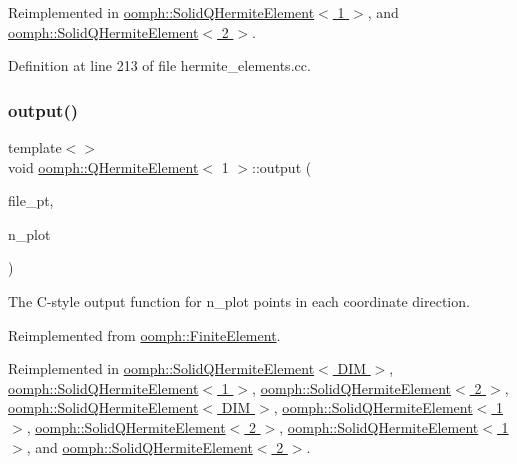 Reimplemented in \hyperlink{classoomph_1_1SolidQHermiteElement_ae4f251ca932301e92e1b897cec6f0459}{oomph\+::\+Solid\+Q\+Hermite\+Element$<$ 1 $>$}, and \hyperlink{classoomph_1_1SolidQHermiteElement_ae4f251ca932301e92e1b897cec6f0459}{oomph\+::\+Solid\+Q\+Hermite\+Element$<$ 2 $>$}.



Definition at line 213 of file hermite\+\_\+elements.\+cc.

\mbox{\label{classoomph_1_1QHermiteElement_a06e716f7fa8ed3e595089b88c68b1026}} 
\subsubsection{\texorpdfstring{output()}{output()}\hspace{0.1cm}{\footnotesize\ttfamily [4/12]}}
{\footnotesize\ttfamily template$<$$>$ \\
void \hyperlink{classoomph_1_1QHermiteElement}{oomph\+::\+Q\+Hermite\+Element}$<$ 1 $>$\+::output (\begin{DoxyParamCaption}\item[{F\+I\+LE $\ast$}]{file\+\_\+pt,  }\item[{const unsigned \&}]{n\+\_\+plot }\end{DoxyParamCaption})\hspace{0.3cm}{\ttfamily [virtual]}}



The C-\/style output function for n\+\_\+plot points in each coordinate direction. 



Reimplemented from \hyperlink{classoomph_1_1FiniteElement_adfaee690bb0608f03320eeb9d110d48c}{oomph\+::\+Finite\+Element}.



Reimplemented in \hyperlink{classoomph_1_1SolidQHermiteElement_aabd23592071d29249154d7cde20f2d88}{oomph\+::\+Solid\+Q\+Hermite\+Element$<$ D\+I\+M $>$}, \hyperlink{classoomph_1_1SolidQHermiteElement_aabd23592071d29249154d7cde20f2d88}{oomph\+::\+Solid\+Q\+Hermite\+Element$<$ 1 $>$}, \hyperlink{classoomph_1_1SolidQHermiteElement_aabd23592071d29249154d7cde20f2d88}{oomph\+::\+Solid\+Q\+Hermite\+Element$<$ 2 $>$}, \hyperlink{classoomph_1_1SolidQHermiteElement_adb8a603a0f50a7944be7af4a1cd0abc5}{oomph\+::\+Solid\+Q\+Hermite\+Element$<$ D\+I\+M $>$}, \hyperlink{classoomph_1_1SolidQHermiteElement_adb8a603a0f50a7944be7af4a1cd0abc5}{oomph\+::\+Solid\+Q\+Hermite\+Element$<$ 1 $>$}, \hyperlink{classoomph_1_1SolidQHermiteElement_adb8a603a0f50a7944be7af4a1cd0abc5}{oomph\+::\+Solid\+Q\+Hermite\+Element$<$ 2 $>$}, \hyperlink{classoomph_1_1SolidQHermiteElement_a29b211e63df67028435a71ac732d47ad}{oomph\+::\+Solid\+Q\+Hermite\+Element$<$ 1 $>$}, and \hyperlink{classoomph_1_1SolidQHermiteElement_a29b211e63df67028435a71ac732d47ad}{oomph\+::\+Solid\+Q\+Hermite\+Element$<$ 2 $>$}.




